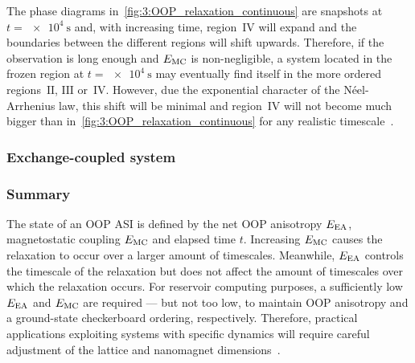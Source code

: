 
The phase diagrams in~\cref{fig:3:OOP_relaxation_continuous} are snapshots at $t = \SI{e4}{\second}$ and, with increasing time, region~$\mathrm{IV}$ will expand and the boundaries between the different regions will shift upwards.
Therefore, if the observation is long enough and $E_\mathrm{MC}$ is non-negligible, a system located in the frozen region at $t = \SI{e4}{\second}$ may eventually find itself in the more ordered regions~$\mathrm{II}$, $\mathrm{III}$ or~$\mathrm{IV}$.
However, due the exponential character of the N\'eel-Arrhenius law, this shift will be minimal and region~$\mathrm{IV}$ will not become much bigger than in~\cref{fig:3:OOP_relaxation_continuous} for any realistic timescale~\cite{KUR-24}.

\subsubsection{Exchange-coupled system} %

\subsubsection{Summary}
The state of an OOP ASI is defined by the net OOP anisotropy $E_\mathrm{EA}$, magnetostatic coupling $E_\mathrm{MC}$ and elapsed time $t$.
Increasing $E_\mathrm{MC}$ causes the relaxation to occur over a larger amount of timescales.
Meanwhile, $E_\mathrm{EA}$ controls the timescale of the relaxation but does not affect the amount of timescales over which the relaxation occurs.
For reservoir computing purposes, a sufficiently low $E_\mathrm{EA}$ and $E_\mathrm{MC}$ are required --- but not too low, to maintain OOP anisotropy and a ground-state checkerboard ordering, respectively.
Therefore, practical applications exploiting systems with specific dynamics will require careful adjustment of the lattice and nanomagnet dimensions~\cite{KUR-24}.

